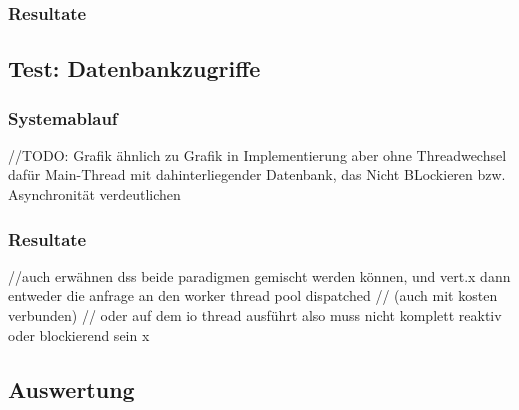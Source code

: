 \subsubsection{Resultate}

\subsection{Test: Datenbankzugriffe}
\label{section:datenbankzugriffe}

\subsubsection{Systemablauf}
//TODO: Grafik ähnlich zu Grafik in Implementierung aber ohne Threadwechsel dafür Main-Thread mit dahinterliegender Datenbank,
das Nicht BLockieren bzw. Asynchronität verdeutlichen

\subsubsection{Resultate}

//auch erwähnen dss beide paradigmen gemischt werden können, und vert.x dann entweder die anfrage an den worker thread pool dispatched
// (auch mit kosten verbunden)
// oder auf dem io thread ausführt also muss nicht komplett reaktiv oder blockierend sein x
\subsection{Auswertung}

\label{section:auswertung}
